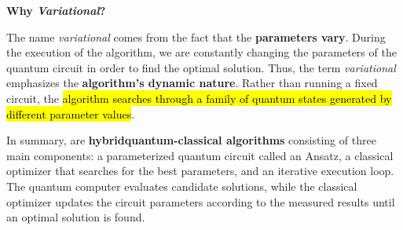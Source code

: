 \highspace
\begin{flushleft}
    \textcolor{Green3}{ \textbf{Why \emph{Variational}?}}
\end{flushleft}
The name \emph{variational} comes from the fact that the \textbf{parameters vary}. During the execution of the algorithm, we are constantly changing the parameters of the quantum circuit in order to find the optimal solution. Thus, the term \emph{variational} emphasizes the \textbf{algorithm's dynamic nature}. Rather than running a fixed circuit, the \hl{algorithm searches through a family of quantum states generated by different parameter values}.

\highspace
In summary,  are \textbf{hybrid\break quantum-classical algorithms} consisting of three main components: a parameterized quantum circuit called an Ansatz, a classical optimizer that searches for the best parameters, and an iterative execution loop. The quantum computer evaluates candidate solutions, while the classical optimizer updates the circuit parameters according to the measured results until an optimal solution is found.